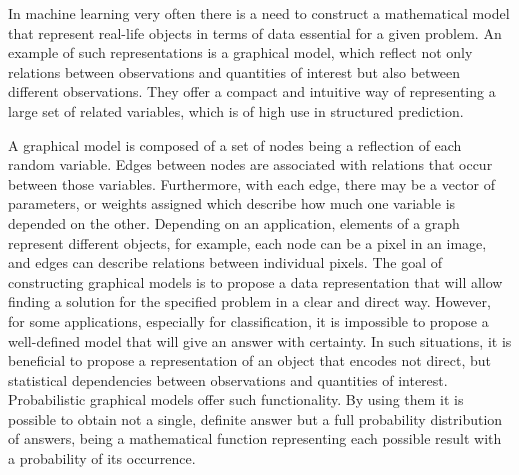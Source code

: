 In machine learning very often there is a need to construct a mathematical model that represent real-life objects in terms of data essential for a given problem. An example of such representations is a graphical model, which reflect not only relations between observations and quantities of interest but also between different observations. They offer a compact and intuitive way of representing a large set of related variables, which is of high use in structured prediction. 

A graphical model is composed of a set of nodes being a reflection of each random variable. Edges between nodes are associated with relations that occur between those variables. Furthermore, with each edge, there may be a vector of parameters, or weights assigned which describe how much one variable is depended on the other. Depending on an application, elements of a graph represent different objects, for example, each node can be a pixel in an image, and edges can describe relations between individual pixels. The goal of constructing graphical models is to propose a data representation that will allow finding a solution for the specified problem in a clear and direct way. However, for some applications, especially for classification, it is impossible to propose a well-defined model that will give an answer with certainty. In such situations, it is beneficial to propose a representation of an object that encodes not direct, but statistical dependencies between observations and quantities of interest. Probabilistic graphical models offer such functionality. By using them it is possible to obtain not a single, definite answer but a full probability distribution of answers, being a mathematical function representing each possible result with a probability of its occurrence. 

